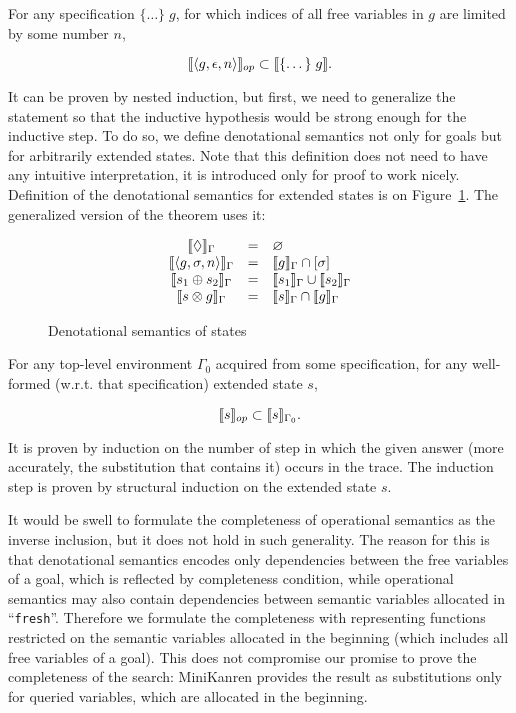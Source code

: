 \begin{theorem}
For any specification $\{\dots\}\; g$, for which indices of all free variables in $g$ are limited by some number $n$,

\[
\llbracket{\left<{g, \epsilon, n}\right>}\rrbracket_{op} \subset \llbracket{\{\dots\}\; g}\rrbracket.
\]
\end{theorem}

It can be proven by nested induction, but first, we need to generalize the statement so that the inductive hypothesis would be strong enough for the inductive step. To do so, we define denotational semantics not only for goals but for arbitrarily extended states. Note that this definition does not need to have any intuitive interpretation, it is introduced only for proof to work nicely. Definition of the denotational semantics for extended states is on Figure~\ref{denotational_semantics_of_states}. The generalized version of the theorem uses it:

\begin{figure}[t]
  \[
  \begin{array}{ccl}
    \llbracket{\Diamond}\rrbracket_\Gamma&=&\varnothing\\
    \llbracket{\left<{g, \sigma, n}\right>}\rrbracket_\Gamma&=&\llbracket{g}\rrbracket_\Gamma\cap[\sigma]\\
    \llbracket{s_1 \oplus s_2}\rrbracket_\Gamma&=&\llbracket{s_1}\rrbracket_\Gamma\cup\llbracket{s_2}\rrbracket_\Gamma\\
    \llbracket{s \otimes g}\rrbracket_\Gamma&=&\llbracket{s}\rrbracket_\Gamma\cap\llbracket{g}\rrbracket_\Gamma\\
  \end{array}
  \]
  \caption{Denotational semantics of states}
  \label{denotational_semantics_of_states}
\end{figure}

\begin{lemma}
For any top-level environment $\Gamma_0$ acquired from some specification, for any well-formed (w.r.t. that specification) extended state $s$,

\[
\llbracket{s}\rrbracket_{op} \subset \llbracket{s}\rrbracket_{\Gamma_0}.
\]
\end{lemma}

It is proven by induction on the number of step in which the given answer (more accurately, the substitution that contains it) occurs in the trace. The induction step is proven by structural induction on the extended state $s$.

It would be swell to formulate the completeness of operational semantics as the inverse inclusion, but it does not hold in such generality. The reason for this is that denotational semantics encodes only dependencies between the free variables of a goal, which is reflected by completeness condition, while operational semantics may also contain dependencies between semantic variables allocated in ``\lstinline|fresh|''. Therefore we formulate the completeness with representing functions restricted on the semantic variables allocated in the beginning (which includes all free variables of a goal). This does not compromise our promise to prove the completeness of the search: MiniKanren provides the result as substitutions only for queried variables, which are allocated in the beginning.

